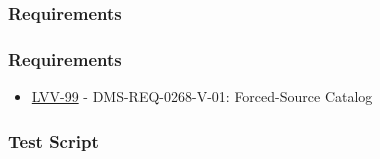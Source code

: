 \hypertarget{requirements-12}{%
\subsubsection{Requirements}\label{requirements-12}}

\hypertarget{requirements-13}{%
\subsubsection{Requirements}\label{requirements-13}}

\begin{itemize}
\tightlist
\item
  \href{https://jira.lsstcorp.org/browse/LVV-99}{LVV-99} -
  DMS-REQ-0268-V-01: Forced-Source Catalog
\end{itemize}

\hypertarget{test-script-6}{%
\subsubsection{Test Script}\label{test-script-6}}

